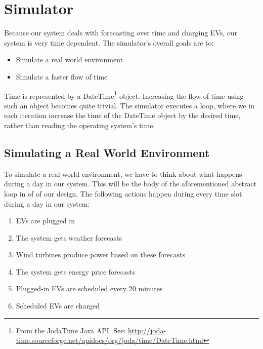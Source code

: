 \section{Simulator}\label{sec:simulator}
Because our system deals with forecasting over time and charging EVs, our system is very time dependent. The simulator's overall goals are to:
\begin{itemize}
\item Simulate a real world environment 
\item Simulate a faster flow of time
\end{itemize}

Time is represented by a DateTime\footnote{From the JodaTime Java API. See: \url{http://joda-time.sourceforge.net/apidocs/org/joda/time/DateTime.html}} object. Increasing the flow of time using such an object becomes quite trivial. The simulator executes a loop, where we in each iteration increase the time of the DateTime object by the desired time, rather than reading the operating system's time. 

\subsection{Simulating a Real World Environment}
To simulate a real world environment, we have to think about what happens during a day in our system. This will be the body of the aforementioned abstract loop in  of  of our design. The following actions happen during every time slot during a day in our system:
\begin{enumerate}
\item EVs are plugged in
\item The system gets weather forecasts 
\item Wind turbines produce power based on these forecasts
\item The system gets energy price forecasts
\item Plugged-in EVs are scheduled every 20 minutes
\item Scheduled EVs are charged
\end{enumerate}


